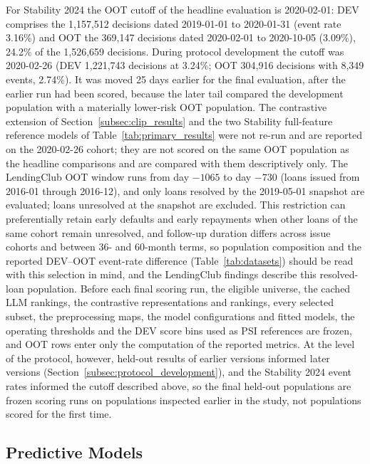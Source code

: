 \documentclass[final,5p,twocolumn]{elsarticle}
\begin{document}
For Stability 2024 the OOT cutoff of the headline evaluation is 2020-02-01: DEV comprises the 1,157,512 decisions dated 2019-01-01 to 2020-01-31 (event rate 3.16\%) and OOT the 369,147 decisions dated 2020-02-01 to 2020-10-05 (3.09\%), 24.2\% of the 1,526,659 decisions. During protocol development the cutoff was 2020-02-26 (DEV 1,221,743 decisions at 3.24\%; OOT 304,916 decisions with 8,349 events, 2.74\%). It was moved 25 days earlier for the final evaluation, after the earlier run had been scored, because the later tail compared the development population with a materially lower-risk OOT population. The contrastive extension of Section~\ref{subsec:clip_results} and the two Stability full-feature reference models of Table~\ref{tab:primary_results} were not re-run and are reported on the 2020-02-26 cohort; they are not scored on the same OOT population as the headline comparisons and are compared with them descriptively only. The LendingClub OOT window runs from day $-1065$ to day $-730$ (loans issued from 2016-01 through 2016-12), and only loans resolved by the 2019-05-01 snapshot are evaluated; loans unresolved at the snapshot are excluded. This restriction can preferentially retain early defaults and early repayments when other loans of the same cohort remain unresolved, and follow-up duration differs across issue cohorts and between 36- and 60-month terms, so population composition and the reported DEV--OOT event-rate difference (Table~\ref{tab:datasets}) should be read with this selection in mind, and the LendingClub findings describe this resolved-loan population. Before each final scoring run, the eligible universe, the cached LLM rankings, the contrastive representations and rankings, every selected subset, the preprocessing maps, the model configurations and fitted models, the operating thresholds and the DEV score bins used as PSI references are frozen, and OOT rows enter only the computation of the reported metrics. At the level of the protocol, however, held-out results of earlier versions informed later versions (Section~\ref{subsec:protocol_development}), and the Stability 2024 event rates informed the cutoff described above, so the final held-out populations are frozen scoring runs on populations inspected earlier in the study, not populations scored for the first time.

\subsection{Predictive Models}
\label{subsec:models}
\end{document}
